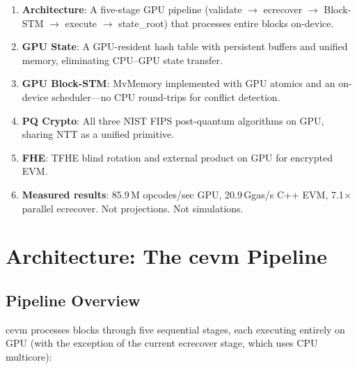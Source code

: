 \documentclass[11pt]{article}
\begin{document}
\begin{enumerate}
\item \textbf{Architecture}: A five-stage GPU pipeline (validate $\to$ ecrecover $\to$
      Block-STM $\to$ execute $\to$ state\_root) that processes entire blocks on-device.
\item \textbf{GPU State}: A GPU-resident hash table with persistent buffers and
      unified memory, eliminating CPU--GPU state transfer.
\item \textbf{GPU Block-STM}: MvMemory implemented with GPU atomics and an on-device
      scheduler---no CPU round-trips for conflict detection.
\item \textbf{PQ Crypto}: All three NIST FIPS post-quantum algorithms on GPU, sharing
      NTT as a unified primitive.
\item \textbf{FHE}: TFHE blind rotation and external product on GPU for encrypted EVM.
\item \textbf{Measured results}: 85.9\,M opcodes/sec GPU, 20.9\,Ggas/s C++ EVM,
      7.1$\times$ parallel ecrecover. Not projections. Not simulations.
\end{enumerate}

\section{Architecture: The cevm Pipeline}
\label{sec:arch}

\subsection{Pipeline Overview}

cevm processes blocks through five sequential stages, each executing entirely on GPU
(with the exception of the current ecrecover stage, which uses CPU multicore):
\end{document}
